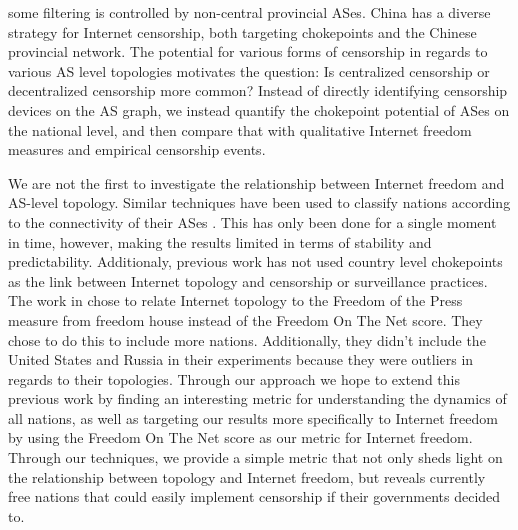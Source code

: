\documentclass{article}
\begin{document}
\begin{multicols}{2}
some filtering is controlled by non-central provincial ASes. China has a
diverse strategy for Internet censorship, both targeting chokepoints and the
Chinese provincial network. The potential for various forms of censorship in
regards to various AS level topologies motivates the question: Is centralized
censorship or decentralized censorship more common? Instead of directly
identifying censorship devices on the AS graph, we instead quantify the
chokepoint potential of ASes on the national level, and then compare that with
qualitative Internet freedom measures and empirical censorship events.
\par
We are not the first to investigate the relationship between Internet freedom and
AS-level topology. Similar techniques have been used to classify nations according
to the connectivity of their ASes \cite{politicsrouting}. This has only been done for a
single moment in time, however, making the results limited in terms of stability and predictability.
Additionaly, previous work has not used country level chokepoints as the link between Internet topology
and censorship or surveillance practices. The work in \cite{politicsrouting} chose to relate Internet topology
to the Freedom of the Press measure from freedom house instead of the Freedom On The Net score. They chose to do this
to include more nations. Additionally, they didn't include the United States and Russia in their experiments because they were
outliers in regards to their topologies. Through our approach we hope to extend this previous work by finding an interesting metric for
understanding the dynamics of all nations, as well as targeting our results more specifically to Internet freedom by using the Freedom On
The Net score as our metric for Internet freedom. Through our techniques, we provide a simple metric that not only 
sheds light on the relationship between topology and Internet freedom, but reveals currently free
nations that could easily implement censorship if their governments decided to.


\end{multicols}
\end{document}
